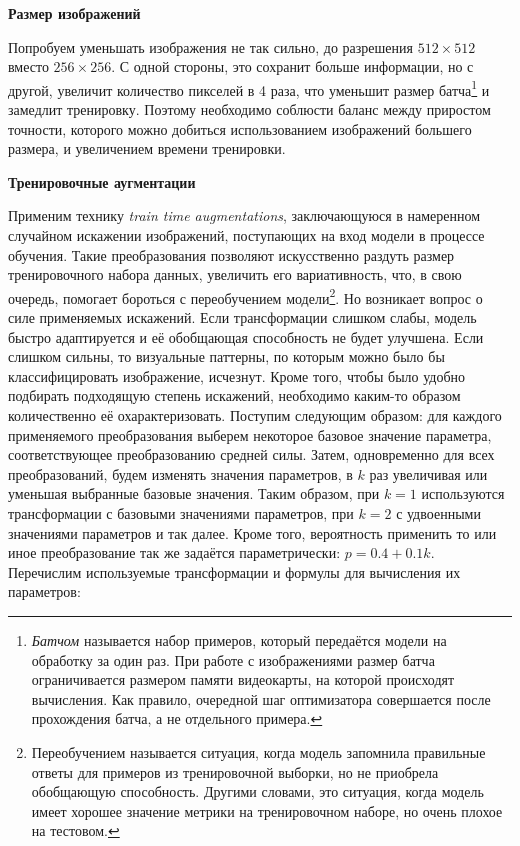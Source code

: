 \indent
\textbf{Размер изображений}

\indent
Попробуем уменьшать изображения не так сильно, 
до разрешения $512 \times 512$ вместо $256 \times 256 $.
С одной стороны, это сохранит больше информации, но с другой, увеличит 
количество пикселей в 4 раза, что уменьшит размер
батча\footnote{\textit{Батчом} называется набор примеров, который передаётся
модели на обработку за один раз. При работе с изображениями размер батча 
ограничивается размером памяти видеокарты, на которой происходят вычисления.
Как правило, очередной шаг оптимизатора совершается после
прохождения батча, а не отдельного примера.}
и замедлит тренировку.
Поэтому необходимо соблюсти баланс между приростом точности,
которого можно добиться использованием изображений большего размера,
и увеличением времени тренировки.

    
\indent
\textbf{Тренировочные аугментации}

\indent
Применим технику \textit{train time augmentations}, заключающуюся
в намеренном случайном искажении изображений, поступающих на вход модели 
в процессе обучения. Такие преобразования позволяют искусственно
раздуть размер тренировочного набора данных, увеличить его 
вариативность, что, в свою очередь, помогает бороться с переобучением
модели\footnote{Переобучением называется ситуация, когда модель
запомнила правильные ответы для примеров из тренировочной выборки,
но не приобрела обобщающую способность. Другими словами, это ситуация,
когда модель имеет хорошее значение метрики на тренировочном наборе,
но очень плохое на тестовом.}.
Но возникает вопрос о силе применяемых искажений.
Если трансформации слишком слабы, модель быстро адаптируется
 и её обобщающая 
способность не будет улучшена. Если слишком сильны, то визуальные паттерны, по
которым можно было бы классифицировать изображение, исчезнут. 
Кроме того, чтобы было удобно подбирать подходящую степень искажений,
необходимо каким-то образом количественно её охарактеризовать.
Поступим следующим образом:
для каждого применяемого преобразования выберем некоторое базовое значение 
параметра, соответствующее преобразованию средней силы. 
Затем, одновременно для всех преобразований, будем изменять значения параметров,
в $k$ раз увеличивая или уменьшая выбранные базовые значения.
Таким образом, при $k = 1$ используются трансформации 
с базовыми значениями параметров, при $k = 2$ с удвоенными 
значениями параметров и так далее. Кроме того, вероятность применить то или
иное преобразование так же задаётся параметрически:
$p = 0.4 + 0.1k$.
Перечислим используемые трансформации
и формулы для вычисления их параметров:

